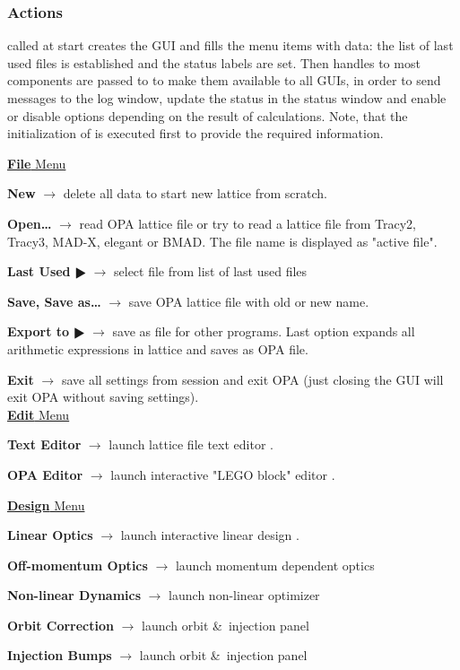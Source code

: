 \documentclass[12pt]{article}
\newcommand\code[1]{{\tt #1}}
\newcommand{\ofld}[1]{\colorbox{black!15}{{{\color{black}\bf #1}}}}
\newcommand\guico[1]{{\color{blue}\code{#1}}}
\newcommand{\evcod}[2]{\ofld{#1} $\rightarrow$ \guico{#2}}
\newcommand{\opagui}[1]{\colorbox{blue!20}{{\color{black}\code{#1}}}}
\newcommand{\ogui}[1]{\hyperref[#1]{\opagui{#1}}}
\newcommand{\opauni}[1]{\colorbox{orange!30}{{\color{black}\code{#1}}}}
\newcommand{\ouni}[1]{\hyperref[#1]{\opauni{#1}}}
\newcommand{\act}[1]{\subsubsection*{Actions} #1}
\begin{document}
\act{
\guico{FormCreate} called at start creates the GUI and fills the menu items with data: the list of last used files is established and the status labels are set. Then handles to most components are passed to \ouni{globlib} to make them available to all GUIs, in order to send messages to the log window, update the status in the status window and enable or disable options depending on the result of calculations.
Note, that the initialization of \ouni{globlib} is executed first to provide the required information. 

\underline{\ofld{File} Menu}

\evcod{New}{fi\_new} delete all data to start new lattice from scratch.

\evcod{Open\dots}{fi\_open} read OPA lattice file or try to read a lattice  file from Tracy2, Tracy3, MAD-X, elegant or BMAD. The file name is displayed as "active file".

\evcod{Last Used $\RHD$}{fi\_last} select file from list of last used files

\evcod{Save, Save as\dots}{fi\_[save,svas]} save OPA lattice file with old or new name.

\evcod{Export to $\RHD$}{ex\_[tracy2,tracy,madx,elegant,bmad,opanovar]} save as file for other programs. Last option expands all arithmetic expressions in lattice and saves as OPA file.

\evcod{Exit}{fi\_exit} save all settings from session and exit OPA (just closing the GUI will exit OPA without saving settings).\\

\underline{\ofld{Edit} Menu}


\evcod{Text Editor}{ed\_text} launch lattice file text editor \ogui{opatexteditor}.

\evcod{OPA Editor}{ed\_oped} launch interactive "LEGO block" editor \ogui{opaeditor}.

\underline{\ofld{Design} Menu}

\evcod{Linear Optics}{ds\_opti} launch interactive linear design \ogui{opalinop}.

\evcod{Off-momentum Optics}{ds\_dppo}  launch momentum dependent optics \ogui{opamomentum}

\evcod{Non-linear Dynamics}{ds\_sext} launch non-linear optimizer \ogui{opachroma}

\evcod{Orbit Correction}{ds\_orbc} launch orbit \&\ injection panel \ogui{opaorbit}

\evcod{Injection Bumps}{ds\_injc } launch orbit \&\ injection panel  \ogui{opaorbit}

}
\end{document}
